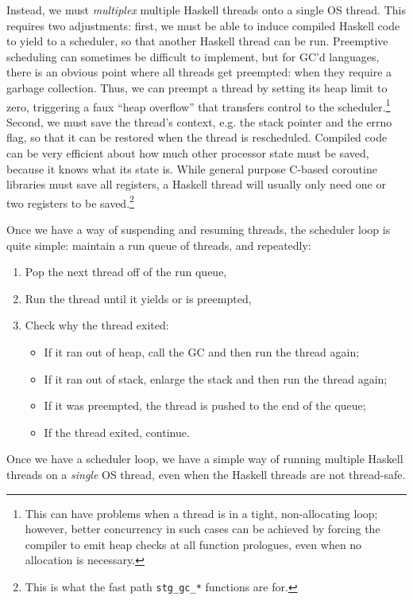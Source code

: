 Instead, we must \emph{multiplex} multiple Haskell threads onto a single
OS thread.  This requires two adjustments: first, we must be able to
induce compiled Haskell code to yield to a scheduler, so that another
Haskell thread can be run.  Preemptive scheduling can sometimes be
difficult to implement, but for GC'd languages, there is an obvious
point where all threads get preempted: when they require a garbage
collection. Thus, we can preempt a thread by setting its heap limit to
zero, triggering a faux ``heap overflow'' that transfers control to the
scheduler.\footnote{This can have problems when a thread is in a tight,
    non-allocating loop; however, better concurrency in such cases can
be achieved by forcing the compiler to emit heap checks at all function
prologues, even when no allocation is necessary.}
Second, we must save the thread's context, e.g. the stack pointer and
the errno flag, so that it can be restored when the thread is
rescheduled.  Compiled code can be very efficient about how much other processor
state must be saved, because it knows what its state is.
While general purpose C-based coroutine libraries
must save all registers, a Haskell thread will usually only need
one or two registers to be saved.\footnote{This is what the fast path \texttt{stg\_gc\_*} functions are for.}

Once we have a way of suspending and resuming threads, the scheduler
loop is quite simple: maintain a run queue of threads, and repeatedly:

\begin{enumerate}
    \item Pop the next thread off of the run queue,
    \item Run the thread until it yields or is preempted,
    \item Check why the thread exited:
        \begin{itemize}
            \item If it ran out of heap, call the GC and then run the thread again;
            \item If it ran out of stack, enlarge the stack and then run the thread again;
            \item If it was preempted, the thread is pushed to the end of the queue;
            \item If the thread exited, continue.
        \end{itemize}
\end{enumerate}

Once we have a scheduler loop, we have a simple way of running multiple
Haskell threads on a \emph{single} OS thread, even when the Haskell
threads are not thread-safe.


